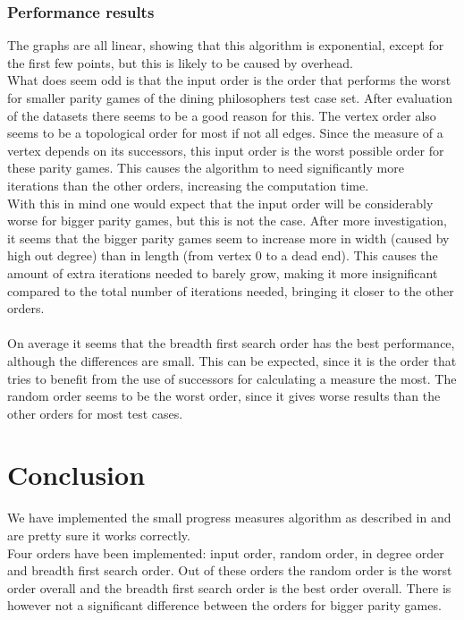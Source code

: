 \documentclass[10pt,a4paper]{article}
\begin{document}
\subsubsection{Performance results}
The graphs are all linear, showing that this algorithm is exponential, except for the first few points, but this is likely to be caused by overhead.\\
What does seem odd is that the input order is the order that performs the worst for smaller parity games of the dining philosophers test case set. After evaluation of the datasets there seems to be a good reason for this. The vertex order also seems to be a topological order for most if not all edges. Since the measure of a vertex depends on its successors, this input order is the worst possible order for these parity games. This causes the algorithm to need significantly more iterations than the other orders, increasing the computation time.\\
With this in mind one would expect that the input order will be considerably worse for bigger parity games, but this is not the case. After more investigation, it seems that the bigger parity games seem to increase more in width (caused by high out degree) than in length (from vertex 0 to a dead end). This causes the amount of extra iterations needed to barely grow, making it more insignificant compared to the total number of iterations needed, bringing it closer to the other orders.
\\\\
On average it seems that the breadth first search order has the best performance, although the differences are small. This can be expected, since it is the order that tries to benefit from the use of successors for calculating a measure the most. The random order seems to be the worst order, since it gives worse results than the other orders for most test cases.

\section{Conclusion}\label{conc}
We have implemented the small progress measures algorithm as described in \cite{spmpaper} and are pretty sure it works correctly.\\
Four orders have been implemented: input order, random order, in degree order and breadth first search order. Out of these orders the random order is the worst order overall and the breadth first search order is the best order overall. There is however not a significant difference between the orders for bigger parity games.
\end{document}
